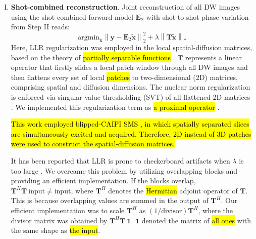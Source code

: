 \documentclass[preprint,12pt,authoryear,review]{elsarticle}
\begin{document}
\begin{enumerate}[I.]
        \item \textbf{Shot-combined reconstruction}.
        Joint reconstruction of all DW images using
        the shot-combined forward model $\mathbf{E}_2$
        with shot-to-shot phase variation from Step II reads:
        \begin{equation}
            \mathrm{argmin}_\mathbf{\tilde{x}} \left\| \mathbf{y} - \mathbf{E}_2 \mathbf{\tilde{x}} \right\|_2^2
            + \lambda \left\| \mathbf{T} \mathbf{\tilde{x}} \right\|_*
            \label{EQU:solve_dwi}
        \end{equation}
    	Here, LLR regularization was employed in the local spatial-diffusion matrices,
    	based on the theory of \hl{partially separable functions} 
    	\citep{liang_2007_psf,trzasko_2011_lr,zhang_2015_llr}.
    	$\mathbf{T}$ represents a linear operator that firstly slides a local patch window
    	through all DW images and then
    	flattens every set of local \hl{patches} 
    	to two-dimensional (2D) matrices,
        comprising spatial and diffusion dimensions.
    	The nuclear norm regularization is enforced via
    	singular value thresholding (SVT) of all flattened 2D matrices
        \citep{cai_2010_svt}.
    	We implemented this regularization term as \hl{a proximal operator}
    	\citep{beck_2017_optim}. 

        \hl{This work employed blipped-CAIPI SMS
        \mbox{\citep{setsompop_2012_blipped}},
        in which spatially separated slices are simultaneously
        excited and acquired.
        Therefore, 2D instead of 3D patches were used to
        construct the spatial-diffusion matrices.}

    	It has been reported that LLR
        is prone to checkerboard artifacts
    	when $\lambda$ is too large \citep{hu_2020_spa_llr}.
    	We overcame this problem by utilizing overlapping blocks and
    	providing an efficient implementation.
    	If the blocks overlap, $\mathbf{T}^H \mathbf{T}~\mathrm{input} \neq \mathrm{input}$,
    	where $\mathbf{T}^H$ denotes the \hl{Hermitian} adjoint operator of $\mathbf{T}$.
    	This is because overlapping values are summed in the output of $\mathbf{T}^H$.
    	Our efficient implementation was to scale $\mathbf{T}^H$
    	as $(1 / \mathrm{divisor})\mathbf{T}^H$,
    	where the divisor matrix was obtained by $\mathbf{T}^H \mathbf{T}~\mathbf{1}$.
    	$\mathbf{1}$ denoted the matrix of \hl{all ones}
    	with the same shape as \hl{the input}.

    \end{enumerate}
\end{document}
